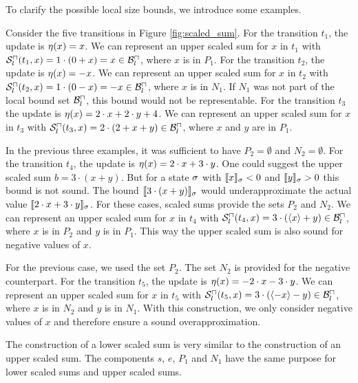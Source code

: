 To clarify the possible local size bounds, we introduce some examples.

\begin{example}
  
  Consider the five transitions in Figure \ref{fig:scaled_sum}.
  For the transition $t_1$, the update is $\eta(x) = x$.
  We can represent an upper scaled sum for $x$ in $t_1$ with ${\mathcal{S}^\sqcap_l}(t_1,x) = 1 \cdot (0 + x) = x \in \mathcal{B}^\sqcap_l$, where $x$ is in $P_1$.
  For the transition $t_2$, the update is $\eta(x) = -x$.
  We can represent an upper scaled sum for $x$ in $t_2$ with ${\mathcal{S}^\sqcap_l}(t_2,x) = 1 \cdot (0 - x) = -x \in \mathcal{B}^\sqcap_l$, where $x$ is in $N_1$.
  If $N_1$ was not part of the local bound set $\mathcal{B}^\sqcap_l$, this bound would not be representable.
  For the transition $t_3$ the update is $\eta(x) = 2 \cdot x + 2 \cdot y + 4$.
  We can represent an upper scaled sum for $x$ in $t_3$ with ${\mathcal{S}^\sqcap_l}(t_3,x) = 2 \cdot (2 + x + y) \in \mathcal{B}^\sqcap_l$, where $x$ and $y$ are in $P_1$.
  
  In the previous three examples, it was sufficient to have $P_2 = \emptyset$ and $N_2 = \emptyset$.
  For the transition $t_4$, the update is $\eta(x) = 2 \cdot x + 3 \cdot y$.
  One could suggest the upper scaled sum $b = 3 \cdot (x + y)$.
  But for a state $\sigma$ with $\llbracket x \rrbracket_{\sigma} < 0$ and $\llbracket y \rrbracket_{\sigma} > 0$ this bound is not sound.
  The bound $\llbracket 3 \cdot (x + y) \rrbracket_{\sigma}$ would underapproximate the actual value $\llbracket 2 \cdot x + 3 \cdot y \rrbracket_{\sigma}$.
  For these cases, scaled sums provide the sets $P_2$ and $N_2$.
  We can represent an upper scaled sum for $x$ in $t_4$ with ${\mathcal{S}^\sqcap_l}(t_4,x) = 3 \cdot (\langle x\rangle + y) \in \mathcal{B}^\sqcap_l$, where $x$ is in $P_2$ and $y$ is in $P_1$.
  This way the upper scaled sum is also sound for negative values of $x$.
  
  For the previous case, we used the set $P_2$.
  The set $N_2$ is provided for the negative counterpart.
  For the transition $t_5$, the update is $\eta(x) = -2 \cdot x - 3 \cdot y$.
  We can represent an upper scaled sum for $x$ in $t_5$ with ${\mathcal{S}^\sqcap_l}(t_5,x) = 3 \cdot (\langle-x\rangle - y) \in \mathcal{B}^\sqcap_l$, where $x$ is in $N_2$ and $y$ is in $N_1$.
  With this construction, we only consider negative values of $x$ and therefore ensure a sound overapproximation.
\end{example}
  
The construction of a lower scaled sum is very similar to the construction of an upper scaled sum.
The components $s$, $e$, $P_1$ and $N_1$ have the same purpose for lower scaled sums and upper scaled sums.

